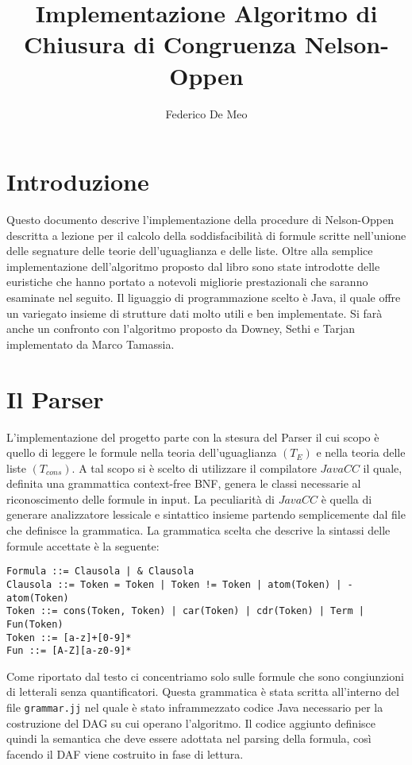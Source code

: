 \documentclass[a4paper,11pt]{article}
\title{Implementazione Algoritmo di Chiusura di Congruenza Nelson-Oppen}
\author{Federico De Meo}
\begin{document}
\maketitle

\footnotesize
\section*{Introduzione}
Questo documento descrive l'implementazione della procedure di Nelson-Oppen descritta a lezione per il calcolo della soddisfacibilità di formule scritte nell'unione delle segnature delle teorie dell'uguaglianza e delle liste. Oltre alla semplice implementazione dell'algoritmo proposto dal libro sono state introdotte delle euristiche che hanno portato a notevoli migliorie prestazionali che saranno esaminate nel seguito.
Il liguaggio di programmazione scelto è Java, il quale offre un variegato insieme di strutture dati molto utili e ben implementate.
Si farà anche un confronto con l'algoritmo proposto da Downey, Sethi e Tarjan implementato da Marco Tamassia.

\section{Il Parser}
L'implementazione del progetto parte con la stesura del Parser il cui scopo è quello di leggere le formule nella teoria dell'uguaglianza $(T_E)$ e nella teoria delle liste $(T_{cons})$.
A tal scopo si è scelto di utilizzare il compilatore $JavaCC$ il quale, definita una grammattica context-free BNF, genera le classi necessarie al riconoscimento delle formule in input.
La peculiarità di $JavaCC$ è quella di generare analizzatore lessicale e sintattico insieme partendo semplicemente dal file che definisce la grammatica.
La grammatica scelta che descrive la sintassi delle formule accettate è la seguente:
\begin{lstlisting}
Formula ::= Clausola | & Clausola
Clausola ::= Token = Token | Token != Token | atom(Token) | -atom(Token)
Token ::= cons(Token, Token) | car(Token) | cdr(Token) | Term | Fun(Token)
Token ::= [a-z]+[0-9]*
Fun ::= [A-Z][a-z0-9]*
\end{lstlisting}
Come riportato dal testo ci concentriamo solo sulle formule che sono congiunzioni di letterali senza quantificatori.
Questa grammatica è stata scritta all'interno del file {\tt grammar.jj} nel quale è stato inframmezzato codice Java necessario per la costruzione del DAG su cui operano l'algoritmo.
Il codice aggiunto definisce quindi la semantica che deve essere adottata nel parsing della formula, così facendo il DAF viene costruito in fase di lettura.
\end{document}
